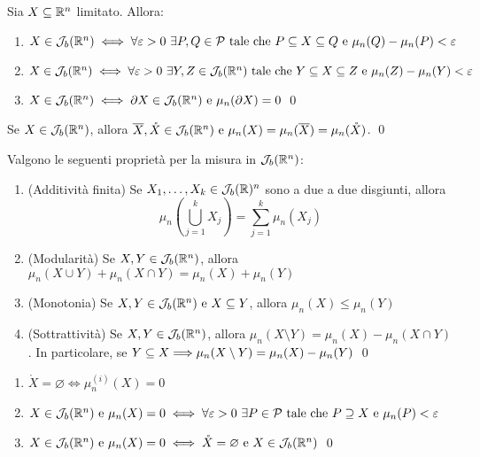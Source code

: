 \begin{theorem}
    Sia $X\subseteq \mathbb{R}^n$ limitato. Allora:
    \begin{enumerate}
        \item $X\in \mathcal{J}_b(\mathbb{R}^n) \iff \forall \varepsilon > 0 \ \exists P,Q \in \mathcal{P} \text{ tale che } P \subseteq X \subseteq Q \text{ e } \mu_n(Q)-\mu_n(P) < \varepsilon$
        \item $X \in \mathcal{J}_b(\mathbb{R}^n) \iff \forall \varepsilon > 0 \ \exists Y,Z \in \mathcal{J}_b(\mathbb{R}^n) \text{ tale che } Y \subseteq X \subseteq Z \text{ e } \mu_n(Z)-\mu_n(Y) < \varepsilon$
        \item $X \in \mathcal{J}_b(\mathbb{R}^n)\iff \partial X \in \mathcal{J}_b(\mathbb{R}^n) \text{ e } \mu_n(\partial X)=0$
        \qed
    \end{enumerate}
\end{theorem}

\begin{corollary}
    Se $X \in \mathcal{J}_b(\mathbb{R}^n)$, allora $\overline{X},\mathring X \in \mathcal{J}_b(\mathbb{R}^n) \text{ e } \mu_n(X)=\mu_n(\overline{X})=\mu_n(\mathring X)$.
    \qed
\end{corollary}

\begin{theorem}
    [Proprietà di $\J_b(\R^n)$]
    Valgono le seguenti proprietà per la misura in $\J_b(\R^n)$:
    \begin{enumerate}
        \item (Additività finita) Se $X_1,\dots,X_k \in \mathcal{J}_b(\mathbb{R})^n$ sono a due a due disgiunti, allora
        $$
            \mu_n\left(\displaystyle \bigcup_{j=1}^kX_j\right) =   \displaystyle\sum_{j=1}^k\mu_n(X_j)
        $$
        \item (Modularità) Se $X,Y \in \mathcal{J}_b(\mathbb{R}^n)$, allora $\mu_n(X\cup Y)+\mu_n(X\cap Y)=\mu_n(X)+\mu_n(Y)$
        \item (Monotonia) Se $X,Y \in \mathcal{J}_b(\mathbb{R}^n) \text{ e } X \subseteq Y$, allora $\mu_n(X) \leq \mu_n(Y)$
        \item (Sottrattività) Se $X,Y \in \mathcal{J}_b(\mathbb{R}^n)$, allora $\mu_n(X\setminus Y)=\mu_n(X)-\mu_n(X\cap Y)$. In particolare, se $Y \subseteq X \Longrightarrow \mu_n (X \setminus Y)=\mu_n(X)-\mu_n(Y)$
        \qed
    \end{enumerate}
\end{theorem}

\begin{theorem}
    \leavevmode
    \begin{enumerate}
        \item $\mathring X = \varnothing \iff \mu_n^{(i)}(X)=0$
        \item $X \in \mathcal{J}_b(\mathbb{R}^n) \text{ e } \mu_n(X)=0 \iff \forall \varepsilon >0 \ \exists P \in \mathcal{P} \text{ tale che } P \supseteq X \text{ e } \mu_n(P)< \varepsilon$
        \item $X \in \mathcal{J}_b(\mathbb{R}^n) \text{ e } \mu_n(X)=0 \iff \mathring X = \varnothing \text{ e } X \in \mathcal{J}_b(\mathbb{R}^n)$
        \qed
    \end{enumerate}
\end{theorem}

